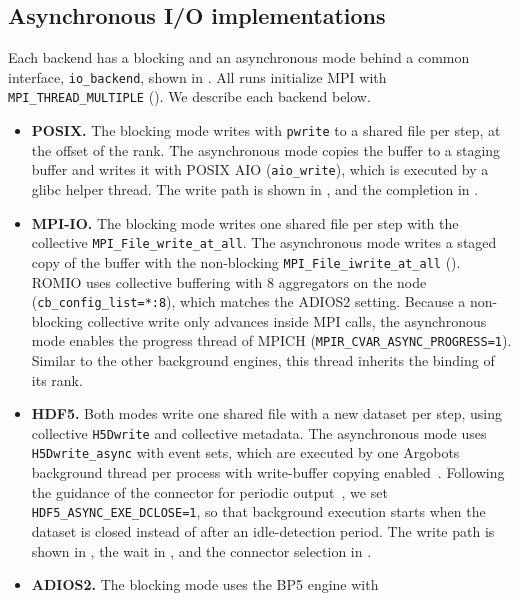 \subsection{Asynchronous I/O implementations}
\label{sec:impl}
Each backend has a blocking and an asynchronous mode behind a common
interface, \texttt{io\_backend}, shown in \srcHeaderBackend. All runs
initialize MPI with \texttt{MPI\_THREAD\_MULTIPLE} (\srcThreadInit). We
describe each backend below.
\begin{itemize}
  \item \textbf{POSIX.} The blocking mode writes with \texttt{pwrite} to a
        shared file per step, at the offset of the rank. The asynchronous
        mode copies the buffer to a staging buffer and writes it with POSIX
        AIO (\texttt{aio\_write}), which is executed by a glibc helper
        thread. The write path is shown in \srcPosixIssue, and the
        completion in \srcPosixWait.
  \item \textbf{MPI-IO.} The blocking mode writes one shared file per step
        with the collective \texttt{MPI\_File\_write\_at\_all}. The
        asynchronous mode writes a staged copy of the buffer with the
        non-blocking \texttt{MPI\_File\_iwrite\_at\_all} (\srcMpiioIssue).
        ROMIO uses collective buffering with 8 aggregators on the node
        (\texttt{cb\_config\_list=*:8}), which matches the ADIOS2 setting.
        Because a non-blocking collective write only advances inside MPI
        calls, the asynchronous mode enables the progress thread of MPICH
        (\texttt{MPIR\_CVAR\_ASYNC\_PROGRESS=1}). Similar to the other
        background engines, this thread inherits the binding of its rank.
  \item \textbf{HDF5.} Both modes write one shared file with a new dataset
        per step, using collective \texttt{H5Dwrite} and collective
        metadata. The asynchronous mode uses \texttt{H5Dwrite\_async} with
        event sets, which are executed by one Argobots background thread per
        process with write-buffer copying enabled~\cite{tang2022async}.
        Following the guidance of the connector for periodic
        output~\cite{volasync_docs}, we set
        \texttt{HDF5\_ASYNC\_EXE\_DCLOSE=1}, so that background execution
        starts when the dataset is closed instead of after an idle-detection
        period. The write path is shown in \srcHdfIssue, the wait in
        \srcHdfWait, and the connector selection in \srcAsyncEnv.
  \item \textbf{ADIOS2.} The blocking mode uses the BP5 engine with

\end{itemize}
